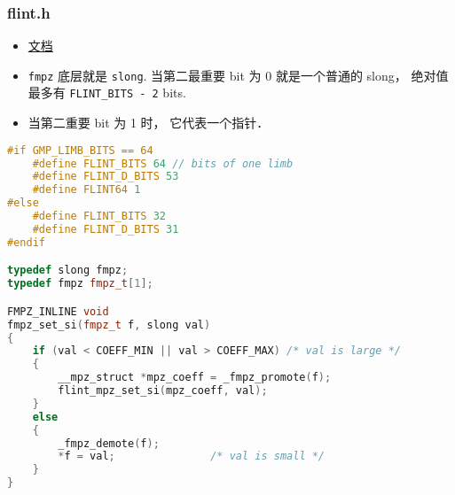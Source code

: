 
\begin{issues}
\issueDraft
\end{issues}


\subsubsection{flint.h}
\begin{itemize}
\item \href{http://flintlib.org/sphinx/fmpz.html}{文档}
\item \verb|fmpz| 底层就是 \verb|slong|. 当第二最重要 bit 为 0 就是一个普通的 slong， 绝对值最多有 \verb|FLINT_BITS - 2| bits.
\item 当第二重要 bit 为 1 时， 它代表一个指针．
\end{itemize}
\begin{lstlisting}[language=cpp]
#if GMP_LIMB_BITS == 64
    #define FLINT_BITS 64 // bits of one limb
    #define FLINT_D_BITS 53
    #define FLINT64 1
#else 
    #define FLINT_BITS 32
    #define FLINT_D_BITS 31
#endif

typedef slong fmpz;
typedef fmpz fmpz_t[1];

FMPZ_INLINE void
fmpz_set_si(fmpz_t f, slong val)
{
    if (val < COEFF_MIN || val > COEFF_MAX) /* val is large */
    {
        __mpz_struct *mpz_coeff = _fmpz_promote(f);
        flint_mpz_set_si(mpz_coeff, val);
    }
    else
    {
        _fmpz_demote(f);
        *f = val;               /* val is small */
    }
}
\end{lstlisting}
